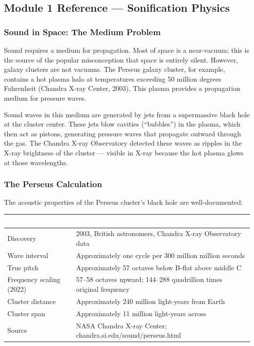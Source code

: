 \documentclass[11pt,letterpaper]{article}
\newcommand{\tableheader}[1]{\textbf{\sffamily\textcolor{white}{#1}}}
\begin{document}
\subsection{Module 1 Reference — Sonification Physics}

\subsubsection{Sound in Space: The Medium Problem}

Sound requires a medium for propagation. Most of space is a near-vacuum; this is the source of the popular misconception that space is entirely silent. However, galaxy clusters are not vacuums. The Perseus galaxy cluster, for example, contains a hot plasma halo at temperatures exceeding 50 million degrees Fahrenheit (Chandra X-ray Center, 2003). This plasma provides a propagation medium for pressure waves.

Sound waves in this medium are generated by jets from a supermassive black hole at the cluster center. These jets blow cavities (``bubbles'') in the plasma, which then act as pistons, generating pressure waves that propagate outward through the gas. The Chandra X-ray Observatory detected these waves as ripples in the X-ray brightness of the cluster — visible in X-ray because the hot plasma glows at those wavelengths.

\subsubsection{The Perseus Calculation}

The acoustic properties of the Perseus cluster's black hole are well-documented:

\begin{center}
\begin{tabularx}{\textwidth}{L{5cm}X}
\toprule
{}
\tableheader{Parameter} & \tableheader{Value / Description} \\
\midrule
Discovery & 2003, British astronomers, Chandra X-ray Observatory data \\
Wave interval & Approximately one cycle per 300 million million seconds \\
True pitch & Approximately 57 octaves below B-flat above middle C \\
Frequency scaling (2022) & 57--58 octaves upward; 144--288 quadrillion times original frequency \\
Cluster distance & Approximately 240 million light-years from Earth \\
Cluster span & Approximately 11 million light-years across \\
Source & NASA Chandra X-ray Center; chandra.si.edu/sound/perseus.html \\
\bottomrule
\end{tabularx}
\end{center}
\end{document}
